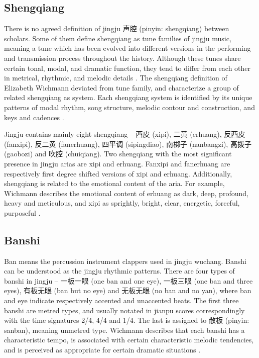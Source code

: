 \subsection{Shengqiang}

There is no agreed definition of jingju 声腔 (pinyin: \gls{shengqiang}) between scholars. Some of them define \gls{shengqiang} as tune families of jingju music, meaning a tune which has been evolved into different versions in the performing and transmission process throughout the history. Although these tunes share certain tonal, modal, and dramatic function, they tend to differ from each other in metrical, rhythmic, and melodic details \cite{Yung1989a}. The \gls{shengqiang} definition of Elizabeth Wichmann deviated from tune family, and characterize a group of related \gls{shengqiang} as system. Each \gls{shengqiang} system is identified by its unique patterns of modal rhythm, song structure, melodic contour and construction, and keys and cadences \cite{Wichmann1991a}.  

Jingju contains mainly eight \gls{shengqiang} -- 西皮 (xipi), 二黄 (erhuang), 反西皮 (fanxipi), 反二黄 (fanerhuang), 四平调 (sipingdiao), 南梆子 (nanbangzi), 高拨子 (gaobozi) and 吹腔 (chuiqiang). Two \gls{shengqiang} with the most significant presence in jingju arias are xipi and erhuang. Fanxipi and fanerhuang are respectively first degree shifted versions of xipi and erhuang. Additionally, \gls{shengqiang} is related to the emotional content of the aria. For example, Wichmann describes the emotional content of erhuang as dark, deep, profound, heavy and meticulous, and xipi as sprightly, bright, clear, energetic, forceful, purposeful \cite{Wichmann1991a}. 

\subsection{Banshi}\label{sec:banshi}

Ban means the percussion instrument clappers used in jingju wuchang. Banshi can be understood as the jingju rhythmic patterns.  There are four types of banshi in jingju -- 一板一眼 (one ban and one eye), 一板三眼 (one ban and three eyes), 有板无眼 (ban but no eye) and 无板无眼 (no ban and no yan), where ban and eye indicate respectively accented and unaccented beats. The first three banshi are metred types, and usually notated in jianpu scores correspondingly with the time signatures 2/4, 4/4 and 1/4. The last is assigned to 散板 (pinyin: sanban), meaning unmetred type. Wichmann describes that each banshi has a characteristic tempo, is associated with certain characteristic melodic tendencies, and is perceived as appropriate for certain dramatic situations \cite{Wichmann1991a}. 

